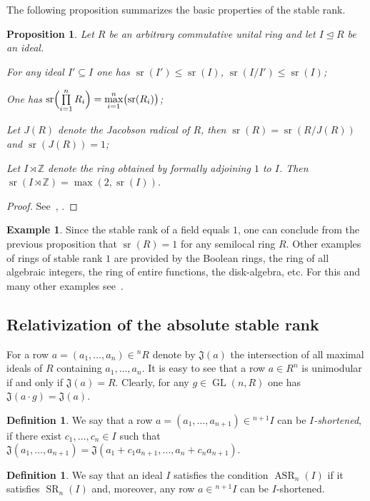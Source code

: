 \documentclass[oneside, 12pt]{amsart}
\theoremstyle{plain}
\numberwithin{equation}{section}
\numberwithin{lemma}{section}
\newtheorem{prop}[lemma]{Proposition}
\theoremstyle{definition}
\newtheorem{dfn}[lemma]{Definition}
\newtheorem{example}[lemma]{Example}
\theoremstyle{remark}
\DeclareMathOperator{\GL}{GL}
\DeclareMathOperator{\SR}{SR}
\DeclareMathOperator{\sr}{sr}
\DeclareMathOperator{\ASR}{ASR}
\begin{document}
The following proposition summarizes the basic properties of the stable rank.
\begin{prop} \label{prop:sr_properties}
Let $R$ be an arbitrary commutative unital ring and let $I\trianglelefteq R$ be an ideal.
\begin{lemlist}
\item For any ideal $I'\subseteq I$ one has $\sr(I')\leqslant\sr(I)$, $\sr(I/I')\leqslant\sr(I)$;
\item One has $\sr\Bigl(\prod\limits_{i=1}^n R_i\Bigr)=\max\limits_{i=1}^n\bigl(\sr(R_i)\bigr)$;
\item Let $J(R)$ denote the Jacobson radical of $R$, then $\sr(R)=\sr(R/J(R))$ and $\sr(J(R))=1$;
\item Let $I\rtimes\mathbb{Z}$ denote the ring obtained by formally adjoining $1$ to $I$. Then $\sr(I\rtimes\mathbb{Z})=\max(2,\sr(I))$.
\end{lemlist}
\end{prop}
\begin{proof} See~\cite[Theorem~2.3]{Va69}, \cite{Va71}. 
\end{proof}
\begin{example}
Since the stable rank of a field equals $1$, one can conclude from the previous proposition that $\sr(R)=1$ for any semilocal ring $R$.
Other examples of rings of stable rank $1$ are provided by the Boolean rings, the ring of all algebraic integers, the ring of entire functions, the disk-algebra, etc. For this and many other examples see~\cite{VasSR1}.

\end{example}

\subsection{Relativization of the absolute stable rank}\label{sec:rel-asr}
For a row $a=(a_1, \ldots, a_n)\in{}^n\!R$ denote by $\mathfrak{J}(a)$ the intersection of all maximal ideals of $R$ containing $a_1, \ldots, a_n$.
It is easy to see that a row $a\in R^n$ is unimodular if and only if $\mathfrak{J}(a)=R$. 
Clearly, for any $g\in\GL(n,R)$ one has $\mathfrak{J}(a\cdot g)=\mathfrak{J}(a)$.
\begin{dfn}\label{dfn:j-stable}
We say that a row $a=(a_1, \ldots, a_{n+1})\in{}^{n+1}\!I$ can be \emph{$I$-shortened}, if there exist $c_1, \ldots, c_n\in I$ such that
$\mathfrak{J}(a_1, \ldots, a_{n+1})=\mathfrak{J}(a_1+c_1a_{n+1}, \ldots, a_n+c_na_{n+1}).$
\end{dfn}
\begin{dfn}\label{dfn:asr}
We say that an ideal $I$ satisfies the condition $\ASR_n(I)$ if it satisfies $\SR_n(I)$ and, moreover, any row $a\in{}^{n+1}\!I$ can be $I$-shortened.
\end{dfn}
\end{document}

